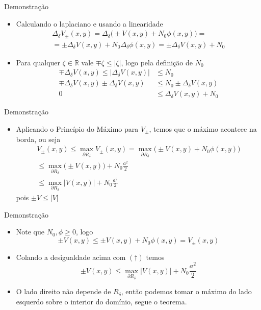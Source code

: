 \documentclass{beamer}
\newcommand{\RR}{\mathbb{R}}
\newcommand{\dR}{\partial R}
\begin{document}
\begin{frame}{Demonstração}
    \begin{itemize}[<+->]
    \item Calculando o laplaciano e usando a linearidade
    \begin{multline*}
    \Delta_\delta V_\pm(x,y) = \Delta_\delta\big( \pm V(x,y) + N_0\phi(x,y)\big) = \\ = \pm \Delta_\delta V(x,y) + N_0\Delta_\delta\phi(x,y) =    \pm \Delta_\delta V(x,y) + N_0 
    \end{multline*} 
    \item Para qualquer $\zeta\in\RR$ vale $\mp\zeta \le |\zeta|$, logo pela definição de $N_0$
    \begin{align*}
        \mp \Delta_\delta V(x,y) \le |\Delta_\delta V(x,y)| &\le N_0 \\
        \mp  \Delta_\delta V(x,y) \pm  \Delta_\delta V(x,y) &\le N_0 \pm  \Delta_\delta V(x,y)\\
        0 &\le  \Delta_\delta V(x,y) + N_0
    \end{align*}
    \end{itemize}    
\end{frame}
\begin{frame}{Demonstração}
    \begin{itemize}
        \item Aplicando o Princípio do Máximo para $V_\pm$, temos que o máximo acontece na borda, ou seja
        \begin{multline*}\tag{$\dagger$}
        V_\pm(x,y) \le \max_{\dR_\delta} V_\pm(x,y) =  \max_{\dR_\delta} \big( \pm V(x,y) + N_0\phi(x,y)\big) \\ \le  \max_{\dR_\delta} \big(\pm V(x,y)\big) + N_0\frac{a^2}{2} \\ \le  \max_{\dR_\delta} \big|V(x,y)\big| + N_0\frac{a^2}{2}               
        \end{multline*}
        pois $\pm V \le |V|$
    \end{itemize}
\end{frame}

\begin{frame}{Demonstração}
    \begin{itemize}[<+->]
        \item Note que $N_0, \phi \ge 0$, logo 
        \[
        \pm V(x,y) \le  \pm V(x,y) +N_0\phi(x,y) = V_\pm(x,y)
        \]
        \item Colando a desigualdade acima com $(\dagger)$ temos
        \[
        \pm V(x,y) \le  \max_{\dR_\delta} \big| V(x,y)\big| + N_0\frac{a^2}{2}  
        \]
        \item O lado direito não depende de $R_\delta$, então podemos tomar o máximo do lado esquerdo sobre o interior do domínio, segue o teorema.
    \end{itemize}
\end{frame}
\end{document}
